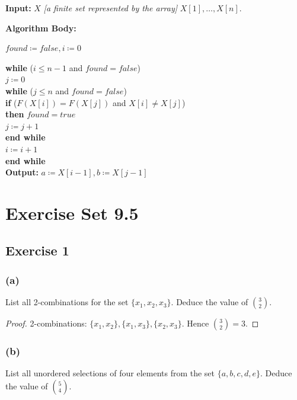 \documentclass[14pt]{extarticle}
\begin{document}
\begin{tcolorbox}[colframe=cyan]
     {\bf Input:} \(X\) {\it [a finite set represented by the array]} \(X[1], \ldots, X[n]\).

          {\bf Algorithm Body:}

     \(found \coloneqq false, i \coloneqq 0\)

     \begin{tabbing}
          {\bf wh}\={\bf ile} (\(i \leq n-1\) and \(found = false\)) \\
          \> \(j \coloneqq 0\) \\
          \> {\bf wh}\={\bf ile} (\(j \leq n\) and \(found = false\))\\
          \>         \> {\bf if} (\(F(X[i]) = F(X[j])\) and \(X[i] \neq X[j]\)) \\
          \>         \> {\bf then} \(found = true\) \\
          \>         \> \(j \coloneqq j+1\) \\
          \> {\bf end while} \\
          \> \(i \coloneqq i+1\) \\
          {\bf end while} \\
          {\bf Output:} \(a \coloneqq X[i-1], b \coloneqq X[j-1]\)
     \end{tabbing}
\end{tcolorbox}

\section{Exercise Set 9.5}

\subsection{Exercise 1}
\subsubsection{(a)}
List all 2-combinations for the set \(\{x_1, x_2, x_3\}\). Deduce the value of \(\binom{3}{2}\).

\begin{proof}
     2-combinations: \(\{x_1, x_2\}, \{x_1, x_3\}, \{x_2, x_3\}\). Hence \(\binom{3}{2} = 3\).
\end{proof}

\subsubsection{(b)}
List all unordered selections of four elements from the set \(\{a, b, c, d,e\}\). Deduce the value of \(\binom{5}{4}\).
\end{document}

